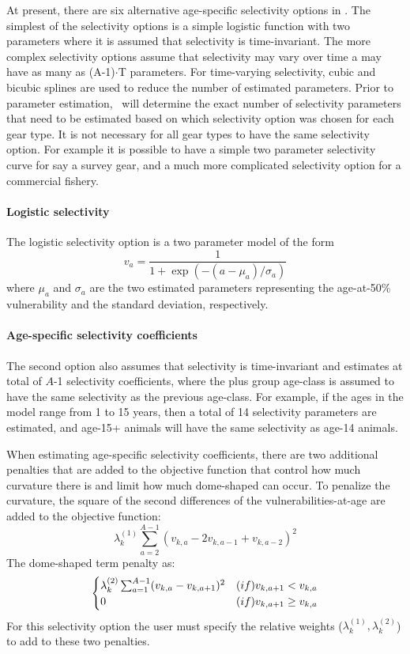 \begin{multicols}{2}
At present, there are six alternative age-specific selectivity options in \iscam.  The simplest of the selectivity options is a simple logistic function with two parameters where it is assumed that selectivity is time-invariant.  The more complex selectivity options assume that selectivity may vary over time a may have as many as (A-1)$\cdot$T parameters.  For time-varying selectivity, cubic and bicubic splines are used to reduce the number of estimated parameters.  Prior to parameter estimation, \iscam\ will determine the exact number of selectivity parameters that need to be estimated based on which selectivity option was chosen for each gear type.  It is not necessary for all gear types to have the same selectivity option.  For example it is possible to have a simple two parameter selectivity curve for say a survey gear, and a much more complicated selectivity option for a commercial fishery.

\paragraph{Logistic selectivity} 
The logistic selectivity option is a two parameter model of the form
\[
v_a = \frac{1}{1+ \exp{(-(a-\mu_{a})/\sigma_a)}}
\]
where $\mu_a$ and $\sigma_a$ are the two estimated parameters representing the age-at-50\% vulnerability and the standard deviation, respectively.

\paragraph{Age-specific selectivity coefficients}
The second option also assumes that selectivity is time-invariant and estimates at total of $A$-1 selectivity coefficients, where the plus group age-class is assumed to have the same selectivity as the previous age-class.  For example, if the ages in the model range from 1 to 15 years, then a total of 14 selectivity parameters are estimated, and age-15+ animals will have the same selectivity as age-14 animals.

When estimating age-specific selectivity coefficients, there are two additional penalties that are added to the objective function that control how much curvature there is and limit how much dome-shaped can occur.  To penalize the curvature, the square of the second differences of the vulnerabilities-at-age are added to the objective function: 
\[
\lambda_k^{(1)} \sum_{a=2}^{A-1}(v_{k,a} - 2v_{k,a-1} + v_{k,a-2})^2
\]
The dome-shaped term penalty as:
\[
\begin{cases}
\lambda_k^{(2)} \sum_{a=1}^{A-1}(v_{k,a} - v_{k,a+1})^2& \mbox(if) v_{k,a+1}< v_{k,a}\\
0 & \mbox(if) v_{k,a+1}\geq v_{k,a}
\end{cases}
\]
For this selectivity option the user must specify the relative weights ($\lambda_k^{(1)},\lambda_k^{(2)}$) to add to these two penalties.


\end{multicols}
